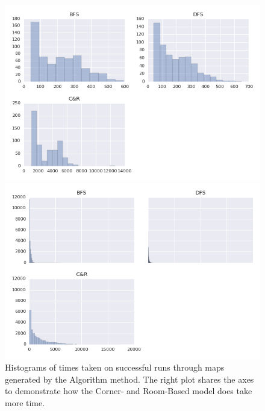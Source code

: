 \documentclass[12pt]{article}
\begin{document}
\begin{figure}[htbp]
\begin{minipage}{.48\linewidth}
\centering
\includegraphics[width=1\linewidth]{TimeHistAlg.png} 
\end{minipage}
\begin{minipage}{.48\linewidth}
\centering
\includegraphics[width=1\linewidth]{TimeHistAlgShare.png} 
\end{minipage}
\caption{Histograms of times taken on successful runs through maps generated by the Algorithm method. The right plot shares the axes to demonstrate how the Corner- and Room-Based model does take more time.}
\end{figure} 
\end{document}
